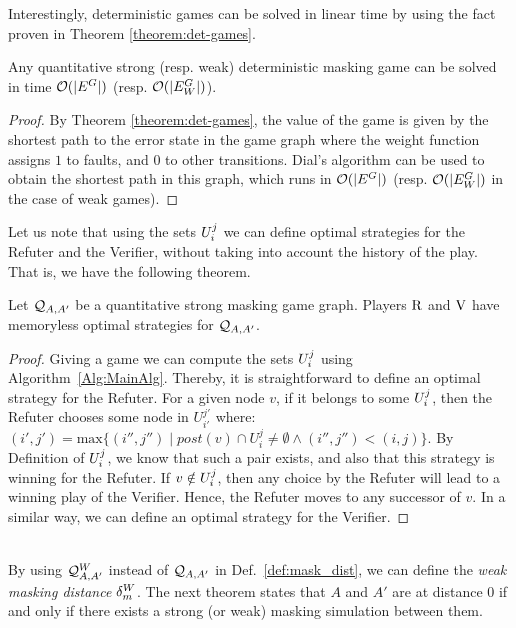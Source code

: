 	Interestingly, deterministic games can be solved in linear time by using the fact proven in Theorem \ref{theorem:det-games}.
\begin{thm}\label{th:deterministic-qgame-complexity} 
  Any quantitative strong (resp. weak) deterministic masking game can be solved in 
time $\mathcal{O}(|E^G|)$ (resp. $\mathcal{O}(|E_W^G|)$).
\end{thm}
\begin{proof} By Theorem \ref{theorem:det-games}, the value of the game is given by the shortest path to the error state in the game graph where the weight function assigns  $1$ to faults, and $0$ to other transitions. Dial's algorithm \cite{Dial69} can be used to obtain the shortest path in this graph, which runs in $\mathcal{O}(|E^G|)$  (resp. $\mathcal{O}(|E^G_W|)$ in the case of weak games).
\qedhere
\end{proof} 

Let us note that using the sets $U^j_i$ we can define optimal strategies for the 
Refuter and the Verifier, without taking into account the history of the play. 
That is, we have the following theorem.
 
\begin{thm} \label{thm:memoryless} Let $\mathcal{Q}_{A, A'}$ be a quantitative strong masking game graph.
  Players $\mathrm{R}$ and $\mathrm{V}$ have memoryless optimal strategies for $\mathcal{Q}_{A, A'}$.
\end{thm}
\begin{proof} Giving a game we can compute the sets $U^j_i$ using Algorithm~\ref{Alg:MainAlg}.
Thereby, it is straightforward to define an optimal strategy for the Refuter. 
For a given node $v$, if it belongs to some $U^j_i$, then the Refuter chooses some node in $U^{j'}_{i'}$ where: 
$(i', j') = \text{max}\{(i'', j'') \mid post(v) \cap U^{j}_{i} \neq \emptyset \wedge (i'',j'') < (i,j) \}$. 
By Definition of $U^j_i$, we know that such a pair exists, and also that this 
strategy is winning for the Refuter. If $v \notin U^j_i$, then any choice by the Refuter will lead to a winning play of the Verifier. 
Hence, the Refuter moves to any successor of $v$.
In a similar way, we can define an optimal strategy for the Verifier.
\qedhere 
\end{proof} \\


By using $\mathcal{Q}^W_{A,A'}$ instead of $\mathcal{Q}_{A, A'}$ in
Def.~\ref{def:mask_dist}, we can define the \emph{weak masking
  distance} $\delta_{m}^W$.  The next theorem states that $A$ and
$A'$ are at distance $0$ if and only if there exists a strong (or weak) masking
simulation between them.

